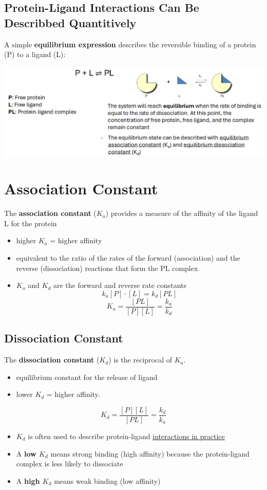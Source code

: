 \documentclass[10pt]{article}
\begin{document}
\subsection*{Protein-Ligand Interactions Can Be Describbed Quantitively}
A simple \textbf{equilibrium expression} describes the reversible binding of a protein (P) to a ligand (L):
\begin{center}
    \includegraphics*[width=\textwidth]{L2_6.png}
\end{center}

\section*{Association Constant}
The \textbf{association constant} ($K_a$) provides a measure of the affinity of the ligand L for the protein
\begin{itemize}
    \item higher $K_a$ = higher affinity
    \item equivalent to the ratio of the rates of the forward (association) and the reverse (dissociation) reactions that form the PL complex
    \item $K_a$ and $K_d$ are the forward and reverse rate constants
    \[k_a [P] \cdot [L] = k_d[PL]\]
    \[K_a = \frac{[PL]}{[P][L]} = \frac{k_a}{k_d}\]
\end{itemize}

\subsection*{Dissociation Constant}
The \textbf{dissociation constant} ($K_d$) is the reciprocal of $K_a$.
\begin{itemize}
    \item equilibrium constant for the release of ligand
    \item lower $K_d$ = higher affinity.
\end{itemize}
\[K_d = \frac{[P][L]}{[PL]} = \frac{k_d}{k_a}\]
\begin{itemize}
    \item $K_d$ is often used to describe protein-ligand \underline{interactions in practice}
    \item A \textbf{low $K_d$} means strong binding (high affinity) because the protein-ligand complex is less likely to dissociate
    \item A \textbf{high $K_d$} means weak binding (low affinity)
\end{itemize}
\end{document}
